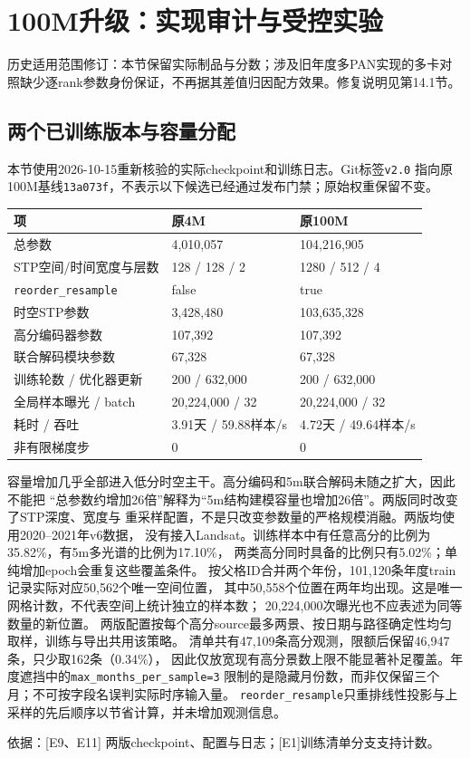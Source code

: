 \documentclass[UTF8,fontset=fandol,zihao=5,a4paper]{ctexart}
\newcommand{\note}[1]{\par\smallskip\noindent\colorbox{pale}{\parbox{0.95\linewidth}{\small #1}}\par\smallskip}
\newcommand{\source}[1]{\par{\footnotesize\color{muted}依据：#1}\par}
\newcommand{\reportpage}{\clearpage}
\begin{document}
\reportpage
\section{100M升级：实现审计与受控实验}
\note{历史适用范围修订：本节保留实际制品与分数；涉及旧年度多PAN实现的多卡对照缺少逐rank参数身份保证，不再据其差值归因配方效果。修复说明见第14.1节。}
\subsection{两个已训练版本与容量分配}
本节使用2026-10-15重新核验的实际checkpoint和训练日志。Git标签\texttt{v2.0}
指向原100M基线\texttt{13a073f}，不表示以下候选已经通过发布门禁；原始权重保留不变。

\noindent\begin{tabularx}{\linewidth}{@{}p{4cm}YY@{}}
\toprule 项 & 原4M & 原100M\\\midrule
总参数 & 4{,}010{,}057 & 104{,}216{,}905\\
STP空间/时间宽度与层数 & 128 / 128 / 2 & 1280 / 512 / 4\\
\texttt{reorder\_resample} & false & true\\
时空STP参数 & 3{,}428{,}480 & 103{,}635{,}328\\
高分编码器参数 & 107{,}392 & 107{,}392\\
联合解码模块参数 & 67{,}328 & 67{,}328\\
训练轮数 / 优化器更新 & 200 / 632{,}000 & 200 / 632{,}000\\
全局样本曝光 / batch & 20{,}224{,}000 / 32 & 20{,}224{,}000 / 32\\
耗时 / 吞吐 & 3.91天 / 59.88样本/s & 4.72天 / 49.64样本/s\\
非有限梯度步 & 0 & 0\\\bottomrule
\end{tabularx}

容量增加几乎全部进入低分时空主干。高分编码和5m联合解码未随之扩大，因此不能把
“总参数约增加26倍”解释为“5m结构建模容量也增加26倍”。两版同时改变了STP深度、宽度与
重采样配置，不是只改变参数量的严格规模消融。两版均使用2020--2021年v6数据，
没有接入Landsat。训练样本中有任意高分的比例为35.82\%，有5m多光谱的比例为17.10\%，
两类高分同时具备的比例只有5.02\%；单纯增加epoch会重复这些覆盖条件。
按父格ID合并两个年份，101{,}120条年度train记录实际对应50{,}562个唯一空间位置，
其中50{,}558个位置在两年均出现。这是唯一网格计数，不代表空间上统计独立的样本数；
20{,}224{,}000次曝光也不应表述为同等数量的新位置。
两版配置按每个高分source最多两景、按日期与路径确定性均匀取样，训练与导出共用该策略。
清单共有47{,}109条高分观测，限额后保留46{,}947条，只少取162条（0.34\%），
因此仅放宽现有高分景数上限不能显著补足覆盖。年度遮挡中的\texttt{max\_months\_per\_sample=3}
限制的是隐藏月份数，而非仅保留三个月；不可按字段名误判实际时序输入量。
\texttt{reorder\_resample}只重排线性投影与上采样的先后顺序以节省计算，并未增加观测信息。
\source{[E9、E11] 两版checkpoint、配置与日志；[E1]训练清单分支支持计数。}
\end{document}
